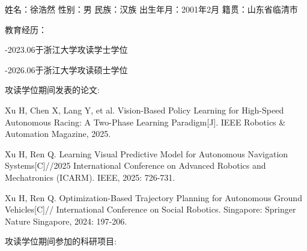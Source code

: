 \cleardoublepage
{}
\noindent 姓名：徐浩然 \hspace{3mm} 性别：男 \hspace{3mm} 民族：汉族 \hspace{3mm} 出生年月：2001年2月 \hspace{3mm} 籍贯：山东省临清市

\vspace{20pt}

\noindent 教育经历：

-2023.06于浙江大学攻读学士学位

-2026.06于浙江大学攻读硕士学位

\vspace{20pt}

\noindent 攻读学位期间发表的论文:

\noindent [1] Xu H, Chen X, Lang Y, et al. Vision-Based Policy Learning for High-Speed Autonomous Racing: A Two-Phase Learning Paradigm[J]. IEEE Robotics \& Automation Magazine, 2025.

\vspace{10pt}
\noindent [2] Xu H, Ren Q. Learning Visual Predictive Model for Autonomous Navigation Systems[C]//2025 International Conference on Advanced Robotics and Mechatronics (ICARM). IEEE, 2025: 726-731.

\vspace{10pt}
\noindent [3] Xu H, Ren Q. Optimization-Based Trajectory Planning for Autonomous Ground Vehicles[C]// International Conference on Social Robotics. Singapore: Springer Nature Singapore, 2024: 197-206.


\vspace{20pt}

\noindent 攻读学位期间参加的科研项目: